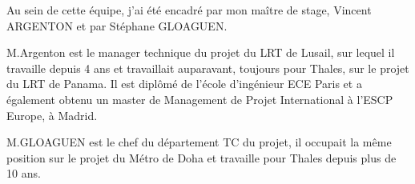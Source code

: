 Au sein de cette équipe, j'ai été encadré par mon maître de stage, Vincent ARGENTON et par Stéphane GLOAGUEN.

M.Argenton est le manager technique du projet du \gls{LRT} de Lusail, sur lequel il travaille depuis 4 ans et travaillait auparavant, toujours pour Thales, sur le projet du \gls{LRT} de Panama. Il est diplômé de l'école d'ingénieur ECE Paris et a également obtenu un master de Management de Projet International à l'ESCP Europe, à Madrid.

M.GLOAGUEN est le chef du département  \gls{TC} du projet, il occupait la même position sur le projet du Métro de Doha et travaille pour Thales depuis plus de 10 ans.

